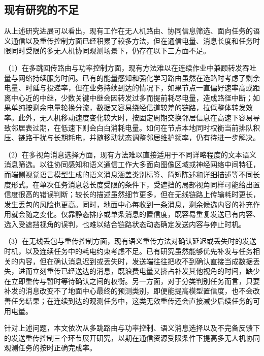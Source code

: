 \subsection{现有研究的不足}

从上述研究进展可以看出，现有工作在无人机路由、协同信息筛选、面向任务的语义通信以及重传控制方面已经积累了较多方法，但在通信电量、消息长度和任务时限同时受限的多无人机协同观测场景下，仍存在以下三方面不足。

（1）在多跳回传路由与功率控制方面，现有方法难以在连续作业中兼顾转发吞吐量与网络持续服务时间。已有的能量感知和强化学习路由虽然在选路时考虑了剩余电量、时延与投递率\cite{qtar,drlfr,drlrr}，但在业务持续到达的情况下，如果节点一直偏好速率高或距离中心近的中继，少数关键中继会因转发过多而提前耗尽电量，造成路径中断；如果单纯按剩余电量轮换分流，数据又容易绕经信道较差的链路，拉低整体转发效率。此外，无人机移动速度变化较大时，按固定周期交换邻居信息在高速下容易导致邻居表过期，在低速下则会白白消耗电量。如何在节点本地同时权衡当前排队积压、链路干扰与长期耗电，并随移动状态调整邻居维护频率，仍有待进一步解决。

（2）在多视角消息选择方面，现有方法难以直接适用于不同详略程度的文本语义消息筛选。以往协同感知和语义通信工作大多面向图像区域或神经网络中间特征\cite{xie2021deepsc,where2comm,how2comm}，而端侧视觉语言模型生成的语义消息涵盖类别标签、简短陈述和详细描述等不同长度形式。在单次任务消息总长度受限的条件下，受遮挡的局部视角同样可能给出置信度很高的错误判断；较长的描述虽然细节更多，但在无线链路上传输耗时更长，发生丢包的风险也更高。同时，地面中心每收到一条消息，剩余候选内容的补充作用就会随之变化。仅靠静态排序或单条消息的置信度，既容易重复发送已有内容、选入受遮挡视角的误判，也难以结合链路状态动态确定发送内容与停止时机。

（3）在无线丢包与重传控制方面，现有语义重传方法对确认延迟或丢失时的发送时机，以及连续任务中的耗电约束考虑不足。已有研究虽然能够优先补发与任务相关的内容\cite{sheng2024harq,li2025semharq}，但在确认消息迟到或丢失时，发送端往往把收不到确认直接当成数据丢失，进而立刻重传已经送达的消息，既浪费电量又挤占补发其他视角的时间，缺少在立即重传与暂时等待确认之间的权衡。另一方面，对于分类判别任务而言，只要补发的消息改变不了地面中心最终的预测类别，即便能提高模型置信度，也不会改善任务结果；在连续到达的观测任务中，这类无效重传还会直接减少后续任务的可用电量。

针对上述问题，本文依次从多跳路由与功率控制、语义消息选择以及不完备反馈下的发送重传控制三个环节展开研究，以期在通信资源受限条件下提高多无人机协同观测任务的按时正确完成率。